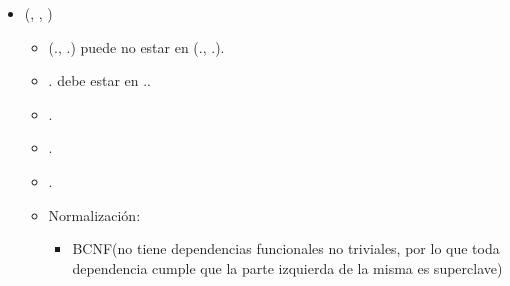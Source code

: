 \begin{itemize}
        \item {}(, , )
            \begin{itemize}
                \item (., 
                    .) puede no estar en 
                    (., 
                    .).
                \item {}. debe estar en 
                    ..
                \item {}.
                \item {}.
                \item {}.
                \item Normalización:
                    \begin{itemize}
                        \item BCNF(no tiene dependencias funcionales no 
                            triviales, por lo que toda dependencia cumple que la
                            parte izquierda de la misma es superclave)
                    \end{itemize}
           \end{itemize}
\end{itemize}
